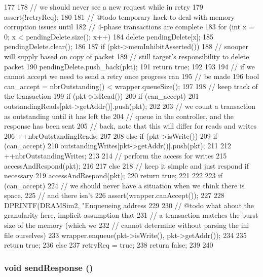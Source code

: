 \begin{DoxyCode}
177 {
178     // we should never see a new request while in retry
179     assert(!retryReq);
180 
181     // @todo temporary hack to deal with memory corruption issues until
182     // 4-phase transactions are complete
183     for (int x = 0; x < pendingDelete.size(); x++)
184         delete pendingDelete[x];
185     pendingDelete.clear();
186 
187     if (pkt->memInhibitAsserted()) {
188         // snooper will supply based on copy of packet
189         // still target's responsibility to delete packet
190         pendingDelete.push_back(pkt);
191         return true;
192     }
193 
194     // if we cannot accept we need to send a retry once progress can
195     // be made
196     bool can_accept = nbrOutstanding() < wrapper.queueSize();
197 
198     // keep track of the transaction
199     if (pkt->isRead()) {
200         if (can_accept) {
201             outstandingReads[pkt->getAddr()].push(pkt);
202 
203             // we count a transaction as outstanding until it has left the
204             // queue in the controller, and the response has been sent
205             // back, note that this will differ for reads and writes
206             ++nbrOutstandingReads;
207         }
208     } else if (pkt->isWrite()) {
209         if (can_accept) {
210             outstandingWrites[pkt->getAddr()].push(pkt);
211 
212             ++nbrOutstandingWrites;
213 
214             // perform the access for writes
215             accessAndRespond(pkt);
216         }
217     } else {
218         // keep it simple and just respond if necessary
219         accessAndRespond(pkt);
220         return true;
221     }
222 
223     if (can_accept) {
224         // we should never have a situation when we think there is space,
225         // and there isn't
226         assert(wrapper.canAccept());
227 
228         DPRINTF(DRAMSim2, "Enqueueing address %
229 
230         // @todo what about the granularity here, implicit assumption that
231         // a transaction matches the burst size of the memory (which we
232         // cannot determine without parsing the ini file ourselves)
233         wrapper.enqueue(pkt->isWrite(), pkt->getAddr());
234 
235         return true;
236     } else {
237         retryReq = true;
238         return false;
239     }
240 }
\end{DoxyCode}
\hypertarget{classDRAMSim2_a07982d2ae9430f5cd468e15bb4920ea4}{
\subsubsection[{sendResponse}]{\setlength{\rightskip}{0pt plus 5cm}void sendResponse ()}}
\label{classDRAMSim2_a07982d2ae9430f5cd468e15bb4920ea4}



